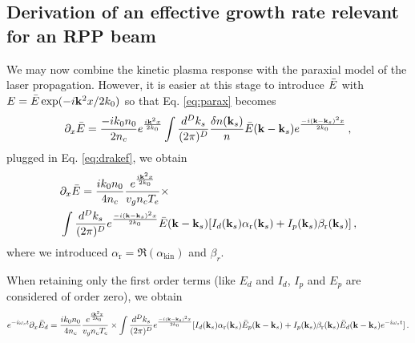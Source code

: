 \documentclass[
 reprint,
 amsmath,amssymb,
 aps,
]{revtex4-1}
\begin{document}
\subsection{Derivation of an effective growth rate relevant for an  RPP beam}

 \begin{widetext}
We may now combine the kinetic plasma response  with the paraxial model of  the laser propagation. 
However, it  is easier at this stage to introduce $\Bar{E}$ with  $E=\Bar{E}\exp(-i \mathbf{k}^2x /2k_0)$ so that Eq. \eqref{eq:parax} becomes
\begin{equation}
    \partial_x \Bar{E}  =\frac{-ik_0n_0}{2n_c} e^{\frac{i\mathbf{k}^2x }{2k_0}}\int \frac{d^Dk_s}{(2\pi)^D} \frac{\delta n(\mathbf{k}_s)}{n} \Bar{E}(\mathbf{k}-\mathbf{k}_s) e^{ \frac{-i(\mathbf{k}-\mathbf{k}_s)^2x}{2k_0}}\, ,  \label{eq:paraxbar}
\end{equation}
 plugged in Eq. \eqref{eq:drakef}, we obtain
\begin{align}
    &\partial_x \Bar{E}  =\frac{ik_0n_0}{4n_c} \frac{e^{\frac{i\mathbf{k}^2 x}{2k_0}}}{  v_g n_c T_e} \times \nonumber \\
   & \int \frac{d^Dk_s}{(2\pi)^D}  e^{ \frac{-i(\mathbf{k}-\mathbf{k}_s)^2x}{2k_0}} \Bar{E}(\mathbf{k}-\mathbf{k}_s) 
   [I_d(\mathbf{k}_s) \alpha_\mathrm{r}   (\mathbf{k}_s) +
   I_p(\mathbf{k}_s) \beta_\mathrm{r}   (\mathbf{k}_s) ] \, ,  \label{eq:paraxbar}
\end{align}
where we introduced $\alpha_\mathrm{r}=\Re(\alpha_\mathrm{kin} )$ and $\beta_r$. 

 When retaining only the first order terms (like $E_d$ and $I_d$, $I_p$ and $E_p$ are considered of order zero), we obtain 
 \begin{align}
   e^{-i\omega_s t}\partial_x \Bar{E}_d  =\frac{ik_0n_0}{4n_c} \frac{e^{\frac{i\mathbf{k}^2 x}{2k_0}}}{  v_g n_c T_e} \times 
   \int \frac{d^Dk_s}{(2\pi)^D} 
   e^{ \frac{-i(\mathbf{k}-\mathbf{k}_s)^2x}{2k_0}}
   [
   I_d(\mathbf{k}_s) \alpha_\mathrm{r}   (\mathbf{k}_s) \Bar{E}_p(\mathbf{k}-\mathbf{k}_s) 
   + I_p(\mathbf{k}_s) \beta_\mathrm{r}   (\mathbf{k}_s) \Bar{E}_d(\mathbf{k}-\mathbf{k}_s) e^{-i\omega_st}
   ]\, .  \label{eq:paraxbar}
\end{align}


\end{widetext}
\end{document}
